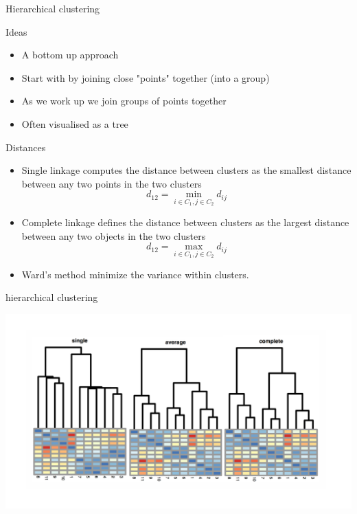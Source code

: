 \documentclass{bredelebeamer}
\begin{document}
\begin{frame}{Hierarchical clustering}
\begin{block}{Ideas}
	
\begin{itemize}
\item A bottom up approach
\item Start with by joining close "points" together (into a group)
\item As we work up we join groups of points together
\item Often visualised as a tree
\end{itemize}
\end{block}

\begin{exampleblock}{Distances}
	
	\begin{itemize}
\item Single linkage computes the distance between clusters as the smallest distance between any two points in the two clusters
\begin{equation}
d_{12} = \min_{i \in C_1, j \in C_2} d_{ij}
\end{equation}
\item Complete linkage defines the distance between clusters as the largest distance between any two objects in the two clusters
\begin{equation}
d_{12} = \max_{i \in C_1, j \in C_2} d_{ij}
\end{equation}
\item Ward’s method minimize the variance within clusters.
\end{itemize}
\end{exampleblock}

\end{frame}



\begin{frame}{hierarchical clustering}

\includegraphics[width = 1\textwidth]{hclust}

\end{frame}
\end{document}
